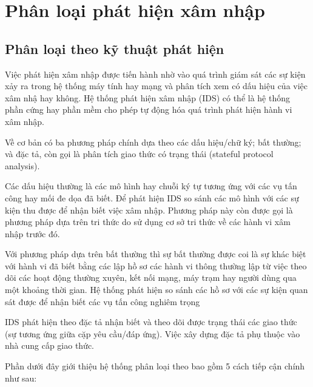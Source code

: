 
\section{Phân loại phát hiện xâm nhập}
\subsection{Phân loại theo kỹ thuật phát hiện}

Việc phát hiện xâm nhập được tiến hành nhờ vào quá trình giám sát các sự kiện xảy ra trong hệ thống máy tính hay mạng và phân tích xem có dấu hiệu của việc xâm nhậ  hay không. Hệ thống phát hiện xâm nhập (IDS) có thể là hệ thống phần cứng hay phần mềm cho phép tự động hóa quá trình phát hiện hành vi xâm nhập. 

Về cơ bản có ba phương pháp chính dựa theo các dấu hiệu/chữ ký; bất thường; và đặc tả, còn gọi là phân tích giao thức có trạng thái (stateful protocol analysis). 

Các dấu hiệu thường là các mô hình hay chuỗi ký tự tương ứng với các vụ tấn công hay mối đe dọa đã biết. Để phát hiện IDS so sánh các mô hình với các sự kiện thu được để nhận biết việc xâm nhập. Phương pháp này còn được gọi là phương pháp dựa trên tri thức do sử dụng cơ sở tri thức về các hành vi xâm nhập trước đó. 

Với phương pháp dựa trên bất thường thì sự bất thường được coi là sự khác biệt với hành vi đã biết bằng các lập hồ sơ các hành vi thông thường lập từ việc theo dõi các hoạt động thường xuyên, kết nối mạng, máy trạm hay người dùng qua một khoảng thời gian. Hệ thống phát hiện so sánh các hồ sơ với các sự kiện quan sát được để nhận biết các vụ tấn công nghiêm trọng 

IDS phát hiện theo đặc tả nhận biết và theo dõi được trạng thái các giao thức (sự tương ứng giữa cặp yêu cầu/đáp ứng). Việc xây dựng đặc tả phụ thuộc vào nhà cung cấp giao thức.

Phần dưới đây giới thiệu hệ thống phân loại theo \cite{9} bao gồm 5 cách tiếp cận chính
như sau:

